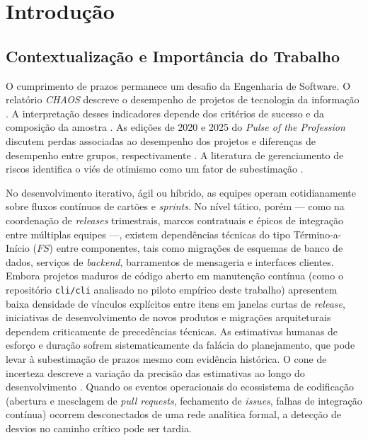 \documentclass[12pt,openany,oneside,a4paper,english,brazilian,sumario=tradicional]{abntex2}
\begin{document}
\tableofcontents*
\cleardoublepage

\textual

\chapter{Introdução}\label{cap:introducao}

\section{Contextualização e Importância do Trabalho}\label{sec:contexto}

O cumprimento de prazos permanece um desafio da Engenharia de Software. O relatório \textit{CHAOS} descreve o desempenho de projetos de tecnologia da informação \cite{standish2020}. A interpretação desses indicadores depende dos critérios de sucesso e da composição da amostra \cite{eveleens2010}. As edições de 2020 e 2025 do \textit{Pulse of the Profession} discutem perdas associadas ao desempenho dos projetos e diferenças de desempenho entre grupos, respectivamente \cite{pmi2020,pmi2025pulse}. A literatura de gerenciamento de riscos identifica o viés de otimismo como um fator de subestimação \cite{flyvbjerg2006}.

No desenvolvimento iterativo, ágil ou híbrido, as equipes operam cotidianamente sobre fluxos contínuos de cartões e \textit{sprints}. No nível tático, porém --- como na coordenação de \textit{releases} trimestrais, marcos contratuais e épicos de integração entre múltiplas equipes ---, existem dependências técnicas do tipo Término-a-Início ($FS$) entre componentes, tais como migrações de esquemas de banco de dados, serviços de \textit{backend}, barramentos de mensageria e interfaces clientes. Embora projetos maduros de código aberto em manutenção contínua (como o repositório \texttt{cli/\allowbreak cli} analisado no piloto empírico deste trabalho) apresentem baixa densidade de vínculos explícitos entre itens em janelas curtas de \textit{release}, iniciativas de desenvolvimento de novos produtos e migrações arquiteturais dependem criticamente de precedências técnicas. As estimativas humanas de esforço e duração sofrem sistematicamente da falácia do planejamento, que pode levar à subestimação de prazos mesmo com evidência histórica. O cone de incerteza descreve a variação da precisão das estimativas ao longo do desenvolvimento \cite{boehm1981,buehler1994,brooks1995,kahneman1979,jorgensen2004,mcconnell2006}. Quando os eventos operacionais do ecossistema de codificação (abertura e mesclagem de \textit{pull requests}, fechamento de \textit{issues}, falhas de integração contínua) ocorrem desconectados de uma rede analítica formal, a detecção de desvios no caminho crítico pode ser tardia.
\end{document}
